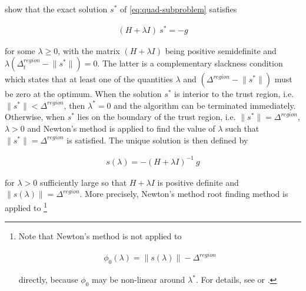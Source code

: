 
\noindent \cite{More1983} show that the exact solution $s^*$ of \ref{eq:quad-subproblem} satisfies

\begin{align}
    ( H + \lambda I ) \ s^* = - g
    \label{eq:exact-solution}
\end{align}

\noindent for some $\lambda \geq 0$, with the matrix $( H + \lambda I )$ being positive semidefinite and 
$\lambda (\Delta^{region}_{t}  - \lVert s^* \rVert) = 0$. The latter is a complementary slackness condition
which states that at least one of the quantities $\lambda$ and $(\Delta^{region}  - \lVert s^* \rVert)$
must be zero at the optimum.
When the solution $s^*$ is interior to the trust region, i.e. $\lVert s^* \rVert < \Delta^{region}$,
then $\lambda^*= 0$ and the algorithm can be terminated immediately.
Otherwise, when $s^*$ lies on the boundary of the trust region, i.e. $\lVert s^* \rVert = \Delta^{region}$,
$\lambda > 0$ and Newton's method is applied to find the value of $\lambda$ such that 
$\lVert s^* \rVert = \Delta^{region}$ is satisfied.
The unique solution is then defined by 

\begin{align}
    s (\lambda) = -(H + \lambda I)^{-1} \ g
    \label{eq:boundary-solution}
\end{align}

\noindent for $\lambda> 0$ sufficiently large so that $H + \lambda I$ is positive definite and 
$ \lVert s (\lambda) \rVert = \Delta^{region}  $. More precisely, Newton's method root finding method is applied to \footnote{Note that Newton's method is not applied to 

\begin{align}
    \phi_0 (\lambda) = \lVert s (\lambda) \rVert - \Delta^{region}
    \label{eq:root-finding}
\end{align}

\noindent directly, because $\phi_0$ may be non-linear around $\lambda^*$. For details, see \cite{More1983} or \cite{Nocedal2006}.}

